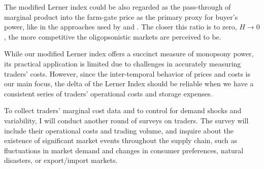\documentclass[12pt]{article}
\begin{document}
The modified Lerner index could be also regarded as the pass-through of marginal product into the farm-gate price as the primary proxy for buyer's power, like in the approaches used by \cite{bergquist_dinerstein_2020} and \cite{atkin2015s}. The closer this ratio is to zero, $H \rightarrow 0$, the more competitive the oligopsonistic markets are perceived to be.

While our modified Lerner index offers a succinct measure of monopsony power, its practical application is limited due to challenges in accurately measuring traders' costs. However, since the inter-temporal behavior of prices and costs is our main focus, the delta of the Lerner Index should be reliable when we have a consistent series of traders' operational costs and storage expenses. 

To collect traders' marginal cost data and to control for demand shocks and variability, I will conduct another round of surveys on traders. The survey will include their operational costs and trading volume, and inquire about the existence of significant market events throughout the supply chain, such as fluctuations in market demand and changes in consumer preferences, natural disasters, or export/import markets.


\end{document}
